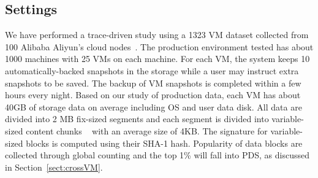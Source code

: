 \subsection{Settings}
We have performed a trace-driven study using  a 1323 VM dataset  collected from 
100 Alibaba Aliyun's cloud nodes~\cite{WeiZhangIEEE}.
The production environment tested has  about 1000 machines with 25 VMs on each machine.
For each VM, the system keeps 10 automatically-backed snapshots in the storage while
a user may instruct extra snapshots to be saved.
The backup of VM snapshots is completed within a few  hours every night.
Based on our study of production  data,  each VM has about  40GB of storage  data  on average
including OS and user data disk.
All data are divided into 2 MB fix-sized segments and each segment is divided into 
variable-sized content chunks ~\cite{similar94,rabin81} with an average size of 4KB.
The signature for variable-sized blocks is computed using their SHA-1 hash. 
Popularity of data blocks are collected through global counting 
and the top 1\% will fall into PDS, as discussed in Section~\ref{sect:crossVM}.



